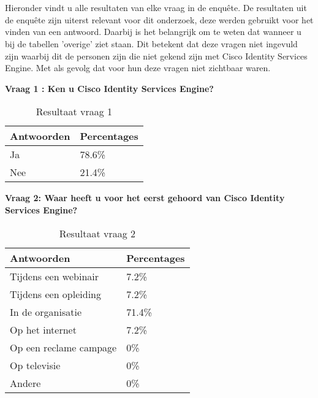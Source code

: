 \chapter{}
\label{ch:Resultaten_enquête}

Hieronder vindt u alle resultaten van elke vraag in de enquête. De resultaten uit de enquête zijn uiterst relevant voor dit onderzoek, deze werden gebruikt voor het vinden van een antwoord. Daarbij is het belangrijk om te weten dat wanneer u bij de tabellen 'overige' ziet staan. Dit betekent dat deze vragen niet ingevuld zijn waarbij dit de personen zijn die niet gekend zijn met Cisco Identity Services Engine. Met als gevolg dat voor hun deze vragen niet zichtbaar waren.
\newline

\textbf{Vraag 1 : Ken u Cisco Identity Services Engine?}
\begin{table}[h!]
\begin{center}
		\begin{tabular}{|l|l|}
			\hline
			\bf Antwoorden    & \bf Percentages \\ \hline
			Ja  & 78.6\% \\ \hline
			Nee & 21.4\% \\ \hline
		\end{tabular}
	\caption{Resultaat vraag 1}
\end{center}
\end{table}

\newpage
\textbf{Vraag 2: Waar heeft u voor het eerst gehoord van Cisco Identity Services Engine?}
\begin{table}[H]
	\begin{center}
		\begin{tabular}{|l|l|}
			\hline
			\bf Antwoorden    & \bf Percentages \\ \hline
			Tijdens een webinair   & 7.2\%  \\ \hline
			Tijdens een opleiding  & 7.2\%  \\ \hline
			In de organisatie      & 71.4\% \\ \hline
			Op het internet        & 7.2\%  \\ \hline
			Op een reclame campage & 0\%    \\ \hline
			Op televisie           & 0\%    \\ \hline
			Andere                 & 0\%    \\ \hline
		\end{tabular}
		\caption{Resultaat vraag 2}
	\end{center}
\end{table}



